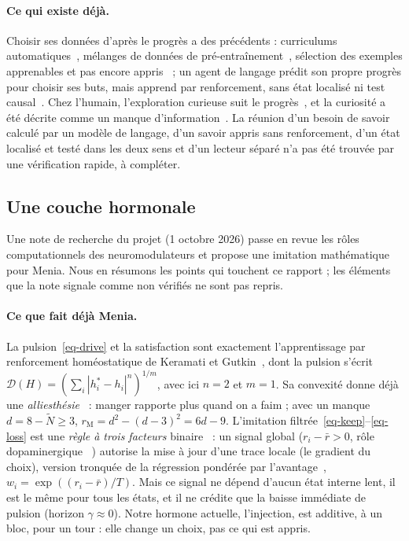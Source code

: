\documentclass[11pt,a4paper]{article}
\begin{document}
\paragraph{Ce qui existe déjà.} Choisir ses données d'après le progrès a des
précédents : curriculums automatiques~\cite{graves2017}, mélanges de données de
pré-entraînement~\cite{albalak2023}, sélection des exemples apprenables et pas encore
appris~\cite{mindermann2022} ; un agent de langage prédit son propre progrès pour
choisir ses buts, mais apprend par renforcement, sans état localisé ni test
causal~\cite{gaven2025}. Chez l'humain, l'exploration curieuse suit le
progrès~\cite{ten2021}, et la curiosité a été décrite comme un manque
d'information~\cite{loewenstein1994}. La réunion d'un besoin de savoir calculé par un
modèle de langage, d'un savoir appris sans renforcement, d'un état localisé et testé
dans les deux sens et d'un lecteur séparé n'a pas été trouvée par une vérification
rapide, à compléter.

\subsection{Une couche hormonale}
\label{sec-hormones}

Une note de recherche du projet (1\ier{} octobre 2026) passe en revue les rôles
computationnels des neuromodulateurs et propose une imitation mathématique pour
Menia. Nous en résumons les points qui touchent ce rapport ; les éléments que la
note signale comme non vérifiés ne sont pas repris.

\paragraph{Ce que fait déjà Menia.} La pulsion~\eqref{eq-drive} et la
satisfaction sont exactement l'apprentissage par renforcement homéostatique de
Keramati et Gutkin~\cite{keramati2014}, dont la pulsion s'écrit
$\mathcal D(H)=(\sum_i|h_i^\ast-h_i|^n)^{1/m}$, avec ici $n=2$ et $m=1$. Sa convexité
donne déjà une \emph{alliesthésie}~\cite{cabanac1971} : manger rapporte plus quand on
a faim ; avec un manque $d=8-\tilde N\ge3$, $r_\mathrm M=d^2-(d-3)^2=6d-9$. L'imitation
filtrée~\eqref{eq-keep}--\eqref{eq-loss} est une \emph{règle à trois facteurs}
binaire~\cite{fremaux2016,gerstner2018} : un signal global
($r_i-\bar r>0$, rôle \og dopaminergique \fg{}~\cite{schultz1997}) autorise la mise à
jour d'une trace locale (le gradient du choix), version tronquée de la régression
pondérée par l'avantage~\cite{peng2019}, $w_i=\exp((r_i-\bar r)/T)$. Mais ce signal
ne dépend d'aucun état interne lent, il est le même pour tous les états, et il ne
crédite que la baisse immédiate de pulsion (horizon $\gamma\approx0$). Notre
\og hormone \fg{} actuelle, l'injection, est additive, à un bloc, pour un tour : elle
change un choix, pas ce qui est appris.
\end{document}
